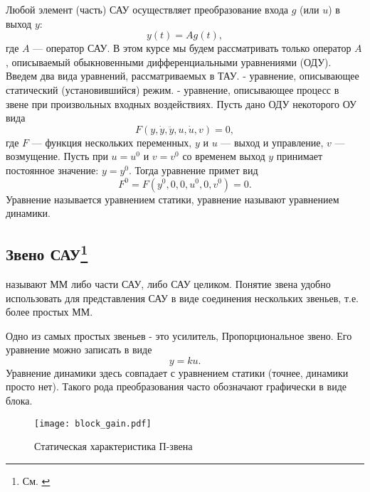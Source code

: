 \documentclass[../../TAU.tex]{subfiles}
\begin{document}
    Любой элемент (часть) САУ осуществляет преобразование входа 
    $g$ (или $u$) в выход $y$:
    \begin{equation}
        y(t) = A g(t),
    \end{equation}
    где $A$ --- оператор САУ. В этом курсе мы будем рассматривать только оператор $A$, описываемый обыкновенными дифференциальными уравнениями (ОДУ). Введем два вида уравнений, рассматриваемых в ТАУ.
     - уравнение, описывающее статический (установившийся) режим.
     - уравнение, описывающее процесс в звене при произвольных входных воздействиях.
    Пусть дано ОДУ некоторого ОУ вида
    \begin{equation}\label{EQ_DYNAMIC}
        F(y,\dot y, \ddot y, u, \dot u, v) = 0,
    \end{equation}
    где $F$ --- функция нескольких переменных, $y$ и $u$ --- выход и управление, $v$ --- возмущение.
    Пусть при ${u=u^0}$ и ${v=v^0}$ со временем выход $y$ принимает постоянное значение: ${y=y^0}$. Тогда уравнение 
    примет вид
    \begin{equation}\label{EQ_STATIC}
        F^0=F(y^0, 0, 0, u^0, 0, v^0) = 0.
    \end{equation}
    Уравнение 
    называется уравнением статики, уравнение 
    называют уравнением динамики.

\subsection[Звено САУ]{Звено САУ\footnote{См. \cite[стр. 21-22]{kim:uch}}}
    
     называют ММ либо части САУ, либо САУ целиком. Понятие звена удобно использовать для представления САУ в виде соединения нескольких звеньев, т.е. более простых ММ.

    Одно из самых простых звеньев - это усилитель, Пропорциональное звено. Его уравнение можно записать в виде
    \begin{equation}
        y = ku.
    \end{equation}
    Уравнение динамики здесь совпадает с уравнением статики (точнее, динамики просто нет). Такого рода преобразования часто обозначают графически в виде блока.
    \begin{figure}[h]
        \centering
        \texttt{[image: block\_gain.pdf]}
        \caption{Статическая характеристика П-звена}
        \centering
    \end{figure}
\end{document}
